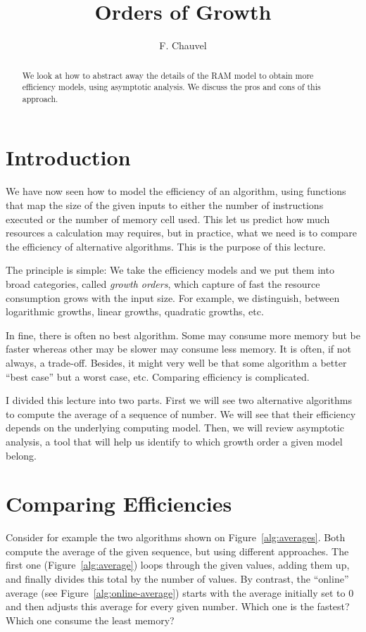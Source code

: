 \documentclass{aldast}
\title{Orders of Growth}
\author{F. Chauvel}
\begin{document}
\maketitle

\begin{abstract}
  We look at how to abstract away the details of the RAM model to obtain
  more efficiency models, using asymptotic analysis. We discuss the
  pros and cons of this approach.
\end{abstract}


\section*{Introduction}
We have now seen how to model the efficiency of an algorithm, using
functions that map the size of the given inputs to either the number
of instructions executed or the number of memory cell used. This let
us predict how much resources a calculation may requires, but in
practice, what we need is to compare the efficiency of alternative
algorithms. This is the purpose of this lecture.

The principle is simple: We take the efficiency models and we put them
into broad categories, called \emph{growth orders}, which capture of
fast the resource consumption grows with the input size. For example,
we distinguish, between logarithmic growths, linear growths, quadratic
growths, etc.

In fine, there is often no best algorithm. Some may consume more
memory but be faster whereas other may be slower may consume less
memory. It is often, if not always, a trade-off. Besides, it might
very well be that some algorithm a better ``best case'' but a worst
case, etc. Comparing efficiency is complicated.

I divided this lecture into two parts. First we will see two
alternative algorithms to compute the average of a sequence of
number. We will see that their efficiency depends on the underlying
computing model. Then, we will review asymptotic analysis, a tool that
will help us identify to which growth order a given model belong.


\section{Comparing Efficiencies}
\label{sec:generality}

Consider for example the two algorithms shown on
Figure~\ref{alg:averages}. Both compute the average of the given
sequence, but using different approaches. The first one
(Figure~\ref{alg:average}) loops through the given values, adding them
up, and finally divides this total by the number of values.  By
contrast, the ``online'' average (see Figure~\ref{alg:online-average})
starts with the average initially set to 0 and then adjusts this
average for every given number. Which one is the fastest? Which one
consume the least memory?
\end{document}
